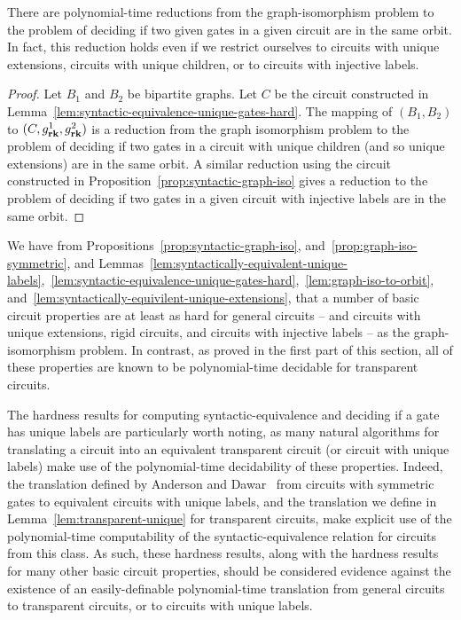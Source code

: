 \documentclass[../paper.tex]{subfiles}
\begin{document}
\begin{lem}
  There are polynomial-time reductions from the graph-isomorphism problem to the
  problem of deciding if two given gates in a given circuit are in the same
  orbit. In fact, this reduction holds even if we restrict ourselves to circuits
  with unique extensions, circuits with unique children, or to circuits with
  injective labels.
  \label{lem:graph-iso-to-orbit}
\end{lem}
\begin{proof}
  Let $B_1$ and $B_2$ be bipartite graphs. Let $C$ be the circuit constructed in
  Lemma~\ref{lem:syntactic-equivalence-unique-gates-hard}. The mapping of $(B_1,
  B_2)$ to $(C, g^1_{\text{\textbf{rk}}}, g^2_{\text{\textbf{rk}}})$ is a reduction from the graph
  isomorphism problem to the problem of deciding if two gates in a circuit with
  unique children (and so unique extensions) are in the same orbit. A similar
  reduction using the circuit constructed in
  Proposition~\ref{prop:syntactic-graph-iso} gives a reduction to the problem of
  deciding if two gates in a given circuit with injective labels are in the same
  orbit.
\end{proof}

We have from Propositions~\ref{prop:syntactic-graph-iso},
and~\ref{prop:graph-iso-symmetric}, and
Lemmas~\ref{lem:syntactically-equivalent-unique-labels},~\ref{lem:syntactic-equivalence-unique-gates-hard},~\ref{lem:graph-iso-to-orbit},
and~\ref{lem:syntactically-equivilent-unique-extensions}, that a number of basic
circuit properties are at least as hard for general circuits -- and circuits
with unique extensions, rigid circuits, and circuits with injective labels -- as
the graph-isomorphism problem. In contrast, as proved in the first part of this
section, all of these properties are known to be polynomial-time decidable for
transparent circuits.

The hardness results for computing syntactic-equivalence and deciding if a gate
has unique labels are particularly worth noting, as many natural algorithms for
translating a circuit into an equivalent transparent circuit (or circuit with
unique labels) make use of the polynomial-time decidability of these properties.
Indeed, the translation defined by Anderson and Dawar~\cite{AndersonD17} from
circuits with symmetric gates to equivalent circuits with unique labels, and the
translation we define in Lemma~\ref{lem:transparent-unique} for transparent
circuits, make explicit use of the polynomial-time computability of the
syntactic-equivalence relation for circuits from this class. As such, these
hardness results, along with the hardness results for many other basic circuit
properties, should be considered evidence against the existence of an
easily-definable polynomial-time translation from general circuits to
transparent circuits, or to circuits with unique labels.
\end{document}
